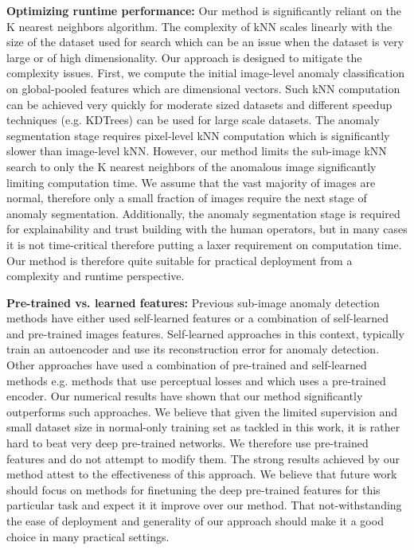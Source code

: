 \documentclass[runningheads]{llncs}
\begin{document}
\textbf{Optimizing runtime performance:} Our method is significantly reliant on the K nearest neighbors algorithm. The complexity of kNN scales linearly with the size of the dataset used for search which can be an issue when the dataset is very large or of high dimensionality. Our approach is designed to mitigate the complexity issues. First, we compute the initial image-level anomaly classification on global-pooled features which are  dimensional vectors. Such kNN computation can be achieved very quickly for moderate sized datasets and different speedup techniques (e.g. KDTrees) can be used for large scale datasets. The anomaly segmentation stage requires pixel-level kNN computation which is significantly slower than image-level kNN. However, our method limits the sub-image kNN search to only the K nearest neighbors of the anomalous image significantly limiting computation time. We assume that the vast majority of images are normal, therefore only a small fraction of images require the next stage of anomaly segmentation. Additionally, the anomaly segmentation stage is required for explainability and trust building with the human operators, but in many cases it is not time-critical therefore putting a laxer requirement on computation time. Our method is therefore quite suitable for practical deployment from a complexity and runtime perspective.

\textbf{Pre-trained vs. learned features:} Previous sub-image anomaly detection methods have either used self-learned features or a combination of self-learned and pre-trained images features. Self-learned approaches in this context, typically train an autoencoder and use its reconstruction error for anomaly detection. Other approaches have used a combination of pre-trained and self-learned methods e.g. methods that use perceptual losses and \cite{bergmann2019uninformed} which uses a pre-trained encoder. Our numerical results have shown that our method significantly outperforms such approaches. We believe that given the limited supervision and small dataset size in normal-only training set as tackled in this work, it is rather hard to beat very deep pre-trained networks. We therefore use pre-trained features and do not attempt to modify them. The strong results achieved by our method attest to the effectiveness of this approach. We believe that future work should focus on methods for finetuning the deep pre-trained features for this particular task and expect it it improve over our method. That not-withstanding the ease of deployment and generality of our approach should make it a good choice in many practical settings.
\end{document}
